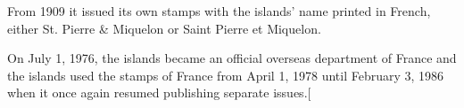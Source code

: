 From 1909 it issued its own stamps with the islands' name printed in French, either St. Pierre & Miquelon or Saint Pierre et Miquelon. 


On July 1, 1976, the islands became an official overseas department of France and the islands used the stamps of France from April 1, 1978 until February 3, 1986 when it once again resumed publishing separate issues.[













                                          